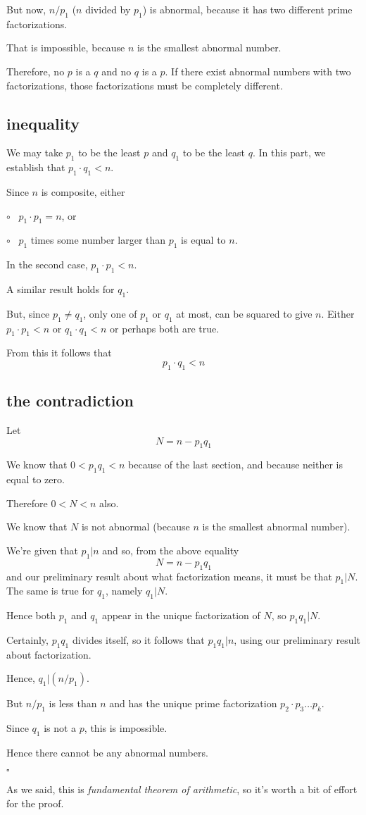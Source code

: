 \documentclass[11pt, oneside]{article}
\begin{document}
But now, $n/p_1$ ($n$ divided by $p_1$) is abnormal, because it has two different prime factorizations.  

That is impossible, because $n$ is the smallest abnormal number.

Therefore, no $p$ is a $q$ and no $q$ is a $p$.  If there exist abnormal numbers with two factorizations, those factorizations must be completely different.

\subsection*{inequality}

We may take $p_1$ to be the least $p$ and $q_1$ to be the least $q$.  In this part, we establish that $p_1 \cdot q_1 < n$.

Since $n$ is composite, either 

$\circ$ \ $p_1 \cdot p_1 = n$, or

$\circ$ \ $p_1$ times some number larger than $p_1$ is equal to $n$.

In the second case, $p_1 \cdot p_1 < n$.

A similar result holds for $q_1$.

But, since $p_1 \ne q_1$, only one of $p_1$ or $q_1$ at most, can be squared to give $n$.  Either $p_1 \cdot p_1 < n$ or $q_1 \cdot q_1 < n$ or perhaps both are true.

From this it follows that 
\[ p_1 \cdot q_1 < n \] 

\subsection*{the contradiction} 

Let 
\[ N = n - p_1 q_1 \]

We know that $0 < p_1 q_1 < n$ because of the last section, and because neither is equal to zero.  

Therefore $0 < N < n$ also.

We know that $N$ is not abnormal (because $n$ is the smallest abnormal number).

We're given that $p_1 | n$ and so, from the above equality 
\[ N = n - p_1 q_1 \]
and our preliminary result about what factorization means, it must be that $p_1 | N$. The same is true for $q_1$, namely $q_1 | N$.  

Hence both $p_1$ and $q_1$ appear in the unique factorization of $N$, so $p_1q_1 | N$.

Certainly, $p_1 q_1$ divides itself, so it follows that $p_1 q_1 | n$, using our preliminary result about factorization.

Hence, $q_1| (n/p_1)$.  

But $n/p_1$ is less than $n$ and has the unique prime factorization $p_2 \cdot p_3 \dots p_k$.

Since $q_1$ is not a $p$, this is impossible.  

Hence there cannot be any abnormal numbers.

$\square$

As we said, this is \emph{fundamental theorem of arithmetic}, so it's worth a bit of effort for the proof.
\end{document}
